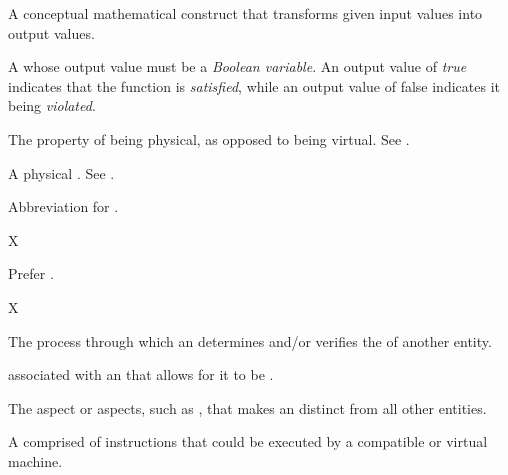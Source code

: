 {
A conceptual mathematical construct that transforms given input values into output values.


A  whose output value must be a \textit{Boolean variable}.
An output value of \textit{true} indicates that the function is \textit{satisfied}, while an output value of false indicates it being \textit{violated}.


The property of being physical, as opposed to being virtual.
See .

A physical .
See .

Abbreviation for .

X

Prefer .

X

The process through which an  determines and/or verifies the  of another entity. 

 associated with an  that allows for it to be .

The aspect or aspects, such as , that makes an  distinct from all other entities.

A   comprised of instructions that could be executed by a compatible  or virtual machine.

}
